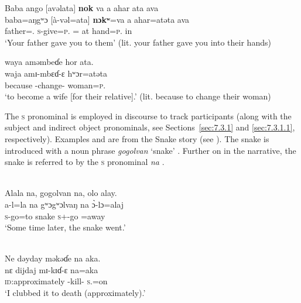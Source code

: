 \ea\label{ex:7:40}
Baba  ango  [avəlata]  \textbf{nok}  va  a  ahar  ata  ava\\
\gll baba=aŋgʷɔ    [à-vəl=ata]  \textbf{nɔkʷ}=va  a  ahar=atəta    ava\\
father={\twoS}.{\POSS}  \textsc{s}-give=\textsc{p}.{\IO}  {\twoS}={\PRF}  at  hand=\textsc{p}.{\POSS}  in\\
\glt ‘Your father gave you to them’ (lit. your father gave you into their hands) 

\medskip
waya  aməmbeɗe  hor  ata.\\
\gll waja  amɪ-mbɛɗ-ɛ  hʷɔr=atəta\\
because  {\DEP}-change-{\CL}  woman=\textsc{p}.{\POSS}\\
\glt ‘to become a wife [for their relative].’  (lit.  because to change their woman)
\z

The \textsc{s} pronominal is employed in discourse to track participants (along with the subject and indirect object pronominals, see Sections~\ref{sec:7.3.1} and \ref{sec:7.3.1.1}, respectively). Examples  and  are from the Snake story (see ).  The snake is introduced with a noun phrase \textit{gogolvan} ‘snake’ . Further on in the narrative, the snake is referred to by the \textsc{s} \DO pronominal \textit{na} . 

\ea\label{ex:7:41}\\
Alala  na,  gogolvan  na,  olo  alay.\\
\gll a-l=la na gʷɔgʷɔlvaŋ na \`{ɔ}-lɔ=alaj\\
\textsc{s}-go=to       {\PSP}  snake      {\PSP} \textsc{s}+{\PFV}-go   =away\\
\glt ‘Some time later, the snake went.’
\z

\ea\label{ex:7:42}\\
Ne dəyday  məkəɗe  na  aka.\\
\gll nɛ {dijdaj} mɪ-kɪɗ-ɛ na=aka \\
{\oneS}  \textsc{id}:approximately     {\NOM}{}-kill-{\CL}  \textsc{s}.{\DO}=on\\
\glt ‘I clubbed it to death (approximately).’
\z

